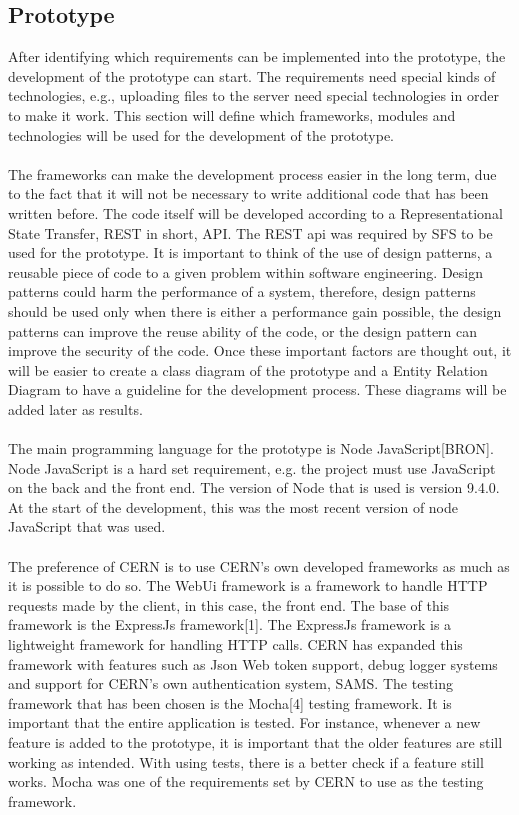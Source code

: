\documentclass[paper=a4, fontsize=11pt,twoside]{scrartcl}	%
\begin{document}
\newpage
\subsection{Prototype}
After identifying which requirements can be implemented into the prototype, the development of the prototype can start. The requirements need special kinds of technologies, e.g., uploading files to the server need special technologies in order to make it work. This section will define which frameworks, modules and technologies will be used for the development of the prototype. \\ \\ 
The frameworks can make the development process easier in the long term, due to the fact that it will not be necessary to write additional code that has been written before. The code itself will be developed according to a Representational State Transfer, REST in short, API. The REST api was required by SFS to be used for the prototype. It is important to think of the use of design patterns, a reusable piece of code to a given problem within software engineering. Design patterns could harm the performance of a system, therefore, design patterns should be used only when there is either a performance gain possible, the design patterns can improve the reuse ability of the code, or the design pattern can improve the security of the code. Once these important factors are thought out, it will be easier to create a class diagram of the prototype and a Entity Relation Diagram to have a guideline for the development process. These diagrams will be added later as results. \\ \\
The main programming language for the prototype is Node JavaScript[BRON]. Node JavaScript is a hard set requirement, e.g. the project must use JavaScript on the back and the front end. The version of Node that is used is version 9.4.0. At the start of the development, this was the most recent version of node JavaScript that was used.  \\ \\
The preference of CERN is to use CERN's own developed frameworks as much as it is possible to do so. The WebUi framework is a framework to handle HTTP requests made by the client, in this case, the front end. The base of this framework is the ExpressJs framework[1]. The ExpressJs framework is a lightweight framework for handling HTTP calls. CERN has expanded this framework with features such as Json Web token support, debug logger systems and support for CERN's own authentication system, SAMS. The testing framework that has been chosen is the Mocha[4] testing framework. It is important that the entire application is tested. For instance, whenever a new feature is added to the prototype, it is important that the older features are still working as intended. With using tests, there is a better check if a feature still works. Mocha was one of the requirements set by CERN to use as the testing framework. \\
\end{document}
